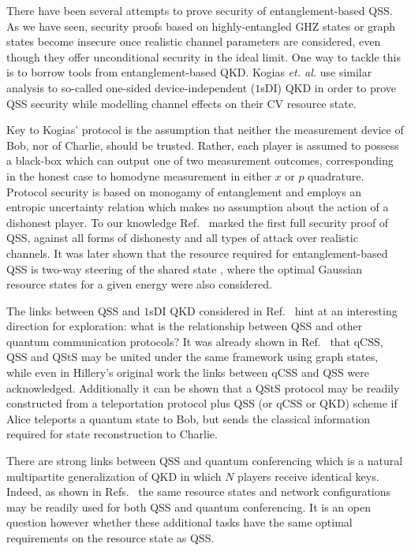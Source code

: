 There have been several attempts to prove security of entanglement-based QSS. As we have seen, security proofs based on highly-entangled GHZ states or graph states become insecure once realistic channel parameters are considered, even though they offer unconditional security in the ideal limit. One way to tackle this is to borrow tools from entanglement-based QKD. Kogias \emph{et. al.} \cite{Kogias2017} use similar analysis to so-called one-sided device-independent ($1$sDI) QKD \cite{Walk2016a, Armstrong2015} in order to prove QSS security while modelling channel effects on their CV resource state.

Key to Kogias' protocol is the assumption that neither the measurement device of Bob, nor of Charlie, should be trusted. Rather, each player is assumed to possess a black-box which can output one of two measurement outcomes, corresponding in the honest case to homodyne measurement in either $x$ or $p$ quadrature. Protocol security is based on monogamy of entanglement and employs an entropic uncertainty relation which makes no assumption about the action of a dishonest player. To our knowledge Ref.~\cite{Kogias2017} marked the first full security proof of QSS, against all forms of dishonesty and all types of attack over realistic channels. It was later shown that the resource required for entanglement-based QSS is two-way steering of the shared state \cite{Xiang2017}, where the optimal Gaussian resource states for a given energy were also considered. 

The links between QSS and $1$sDI QKD considered in Ref.~\cite{Kogias2017} hint at an interesting direction for exploration: what is the relationship between QSS and other quantum communication protocols? It was already shown in Ref.~\cite{Markham2008} that qCSS, QSS and QStS may be united under the same framework using graph states, while even in Hillery's original work \cite{Hillery1999} the links between qCSS and QSS were acknowledged. Additionally it can be shown \cite{Hillery1999} that a QStS protocol may be readily constructed from a teleportation protocol plus QSS (or qCSS or QKD) scheme if Alice teleports a quantum state to Bob, but sends the classical information required for state reconstruction to Charlie.

There are strong links between QSS and quantum conferencing \cite{Wu2016, Ottaviani2017b} which is a natural multipartite generalization of QKD in which $N$ players receive identical keys. Indeed, as shown in Refs.~\cite{Wu2016, Ottaviani2017b} the same resource states and network configurations may be readily used for both QSS and quantum conferencing. It is an open question however whether these additional tasks have the same optimal requirements \cite{Kogias2017, Xiang2017} on the resource state as QSS. %


